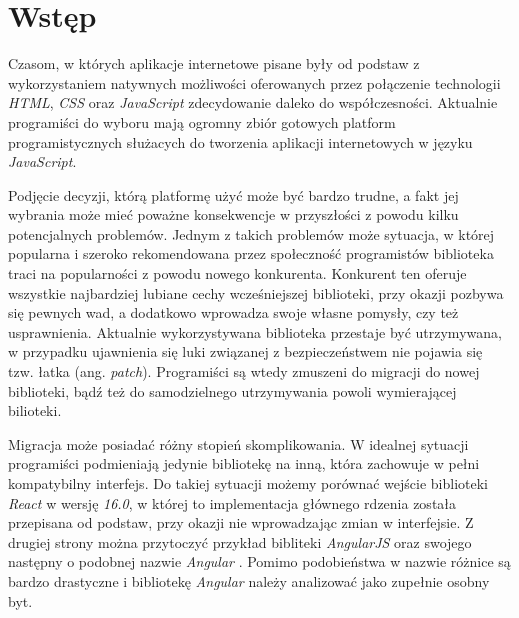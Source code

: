 \documentclass[polish, twoside, 12pt]{mwart}
\let\stdsection\section
\renewcommand*{\section}{\clearpage\stdsection}
\begin{document}

 
\newpage

\tableofcontents

\newpage

\listoffigures
 
\listoftables

\newpage

\section{Wstęp}

Czasom, w których aplikacje internetowe pisane były od podstaw z wykorzystaniem natywnych możliwości oferowanych przez połączenie technologii \emph{HTML}, \emph{CSS} oraz \emph{JavaScript} zdecydowanie daleko do współczesności. Aktualnie programiści do wyboru mają ogromny zbiór gotowych platform programistycznych służacych do tworzenia aplikacji internetowych w języku \emph{JavaScript}.

Podjęcie decyzji, którą platformę użyć może być bardzo trudne, a fakt jej wybrania może mieć poważne konsekwencje w przyszłości z powodu kilku potencjalnych problemów. Jednym z takich problemów może sytuacja, w której popularna i szeroko rekomendowana przez społeczność programistów biblioteka traci na popularności z powodu nowego konkurenta. Konkurent ten oferuje wszystkie najbardziej lubiane cechy wcześniejszej biblioteki, przy okazji pozbywa się pewnych wad, a dodatkowo wprowadza swoje własne pomysły, czy też usprawnienia. Aktualnie wykorzystywana biblioteka przestaje być utrzymywana, w przypadku ujawnienia się luki związanej z bezpieczeństwem nie pojawia się tzw. łatka (ang. \emph{patch}). Programiści są wtedy zmuszeni do migracji do nowej biblioteki, bądź też do samodzielnego utrzymywania powoli wymierającej bilioteki.

Migracja może posiadać różny stopień skomplikowania. W idealnej sytuacji programiści podmieniają jedynie bibliotekę na inną, która zachowuje w pełni kompatybilny interfejs. Do takiej sytuacji możemy porównać wejście biblioteki \emph{React} \cite{react} w wersję \emph{16.0}, w której to implementacja głównego rdzenia została przepisana od podstaw, przy okazji nie wprowadzając zmian w interfejsie. Z drugiej strony można przytoczyć przykład bibliteki \emph{AngularJS} \cite{angularjs} oraz swojego następny o podobnej nazwie \emph{Angular} \cite{angular}. Pomimo podobieństwa w nazwie różnice są bardzo drastyczne i bibliotekę \emph{Angular} należy analizować jako zupełnie osobny byt.
\end{document}
